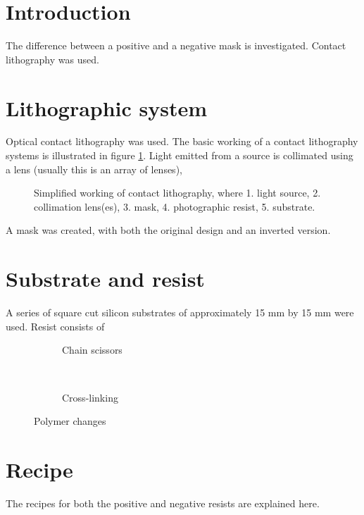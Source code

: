 \section*{Introduction}
The difference between a positive and a negative mask is investigated. Contact lithography was used.

\section*{Lithographic system}
Optical contact lithography was used. The basic working of a contact lithography systems is illustrated in figure \ref{fig:contact-litho}. Light emitted from a source is collimated using a lens (usually this is an array of lenses), 
\begin{figure}[H]
	\centering
	\resizebox{0.7\linewidth}{!}{}
	\caption{Simplified working of contact lithography, where 1. light source, 2. collimation lens(es), 3. mask, 4. photographic resist, 5. substrate.}
	\label{fig:contact-litho}
\end{figure}
A mask was created, with both the original design and an inverted version. 

\section*{Substrate and resist}
A series of square cut silicon substrates of approximately 15 mm by 15 mm were used. Resist consists of 

\begin{figure}[H]
	\centering
	\begin{subfigure}[t]{0.45\linewidth}
		\centering
		\resizebox{\linewidth}{!}{}
		\caption{Chain scissors}
		\label{fig:chainscissor}
	\end{subfigure}
	~
	\begin{subfigure}[t]{0.45\linewidth}
		\centering
		\resizebox{\linewidth}{!}{}
		\caption{Cross-linking}
		\label{fig:crosslinking}
	\end{subfigure}
	\caption{Polymer changes}
	\label{fig:polymers}
\end{figure}


\section*{Recipe}
The recipes for both the positive and negative resists are explained here.
